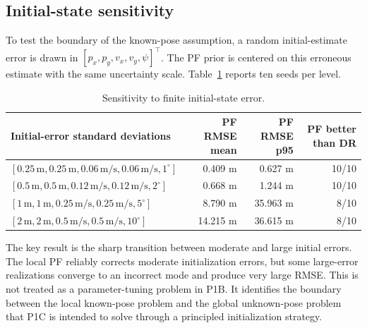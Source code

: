 \subsection{Initial-state sensitivity}
To test the boundary of the known-pose assumption, a random initial-estimate error is drawn in $[p_x,p_y,v_x,v_y,\psi]^\top$. The PF prior is centered on this erroneous estimate with the same uncertainty scale. Table~\ref{tab:p1b_init} reports ten seeds per level.
\begin{table}[ht]
\centering
\caption{Sensitivity to finite initial-state error.}
\label{tab:p1b_init}
\begin{tabular}{p{}rrr}
\toprule
Initial-error standard deviations & PF RMSE mean & PF RMSE p95 & PF better than DR\\
\midrule
$[0.25\,\mathrm{m},0.25\,\mathrm{m},0.06\,\mathrm{m/s},0.06\,\mathrm{m/s},1^\circ]$ & 0.409 m & 0.627 m & 10/10\\
$[0.5\,\mathrm{m},0.5\,\mathrm{m},0.12\,\mathrm{m/s},0.12\,\mathrm{m/s},2^\circ]$ & 0.668 m & 1.244 m & 10/10\\
$[1\,\mathrm{m},1\,\mathrm{m},0.25\,\mathrm{m/s},0.25\,\mathrm{m/s},5^\circ]$ & 8.790 m & 35.963 m & 8/10\\
$[2\,\mathrm{m},2\,\mathrm{m},0.5\,\mathrm{m/s},0.5\,\mathrm{m/s},10^\circ]$ & 14.215 m & 36.615 m & 8/10\\
\bottomrule
\end{tabular}
\end{table}
The key result is the sharp transition between moderate and large initial errors. The local PF reliably corrects moderate initialization errors, but some large-error realizations converge to an incorrect mode and produce very large RMSE. This is not treated as a parameter-tuning problem in P1B. It identifies the boundary between the local known-pose problem and the global unknown-pose problem that P1C is intended to solve through a principled initialization strategy.

